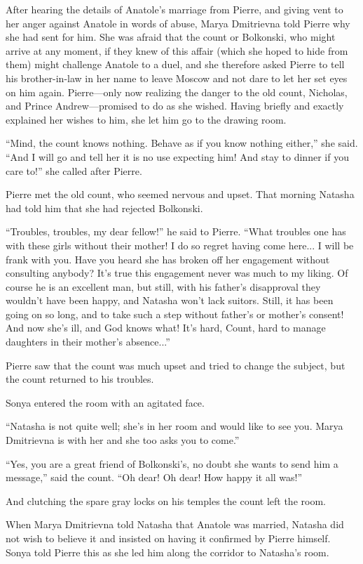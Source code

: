 After hearing the details of Anatole's marriage from Pierre, and
giving vent to her anger against Anatole in words of abuse, Marya
Dmitrievna told Pierre why she had sent for him. She was afraid
that the count or Bolkonski, who might arrive at any moment, if
they knew of this affair (which she hoped to hide from them)
might challenge Anatole to a duel, and she therefore asked Pierre
to tell his brother-in-law in her name to leave Moscow and not
dare to let her set eyes on him again. Pierre---only now
realizing the danger to the old count, Nicholas, and Prince
Andrew---promised to do as she wished. Having briefly and exactly
explained her wishes to him, she let him go to the drawing room.

``Mind, the count knows nothing. Behave as if you know nothing
either,'' she said. ``And I will go and tell her it is no use
expecting him! And stay to dinner if you care to!'' she called
after Pierre.

Pierre met the old count, who seemed nervous and upset. That
morning Natasha had told him that she had rejected Bolkonski.

``Troubles, troubles, my dear fellow!'' he said to Pierre. ``What
troubles one has with these girls without their mother! I do so
regret having come here... I will be frank with you. Have you
heard she has broken off her engagement without consulting
anybody? It's true this engagement never was much to my
liking. Of course he is an excellent man, but still, with his
father's disapproval they wouldn't have been happy, and Natasha
won't lack suitors. Still, it has been going on so long, and to
take such a step without father's or mother's consent! And now
she's ill, and God knows what! It's hard, Count, hard to manage
daughters in their mother's absence...''

Pierre saw that the count was much upset and tried to change the
subject, but the count returned to his troubles.

Sonya entered the room with an agitated face.

``Natasha is not quite well; she's in her room and would like to
see you.  Marya Dmitrievna is with her and she too asks you to
come.''

``Yes, you are a great friend of Bolkonski's, no doubt she wants
to send him a message,'' said the count. ``Oh dear! Oh dear! How
happy it all was!''

And clutching the spare gray locks on his temples the count left
the room.

When Marya Dmitrievna told Natasha that Anatole was married,
Natasha did not wish to believe it and insisted on having it
confirmed by Pierre himself. Sonya told Pierre this as she led
him along the corridor to Natasha's room.

